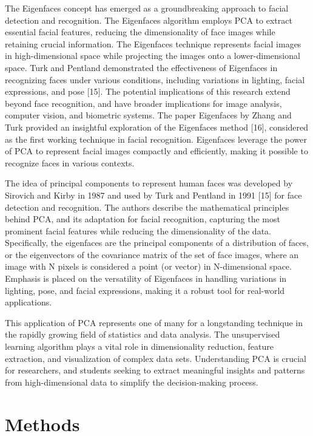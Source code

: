 \documentclass[
  letterpaper,
  DIV=11,
  numbers=noendperiod]{scrreprt}
\begin{document}
The Eigenfaces concept has emerged as a groundbreaking approach to
facial detection and recognition. The Eigenfaces algorithm employs PCA
to extract essential facial features, reducing the dimensionality of
face images while retaining crucial information. The Eigenfaces
technique represents facial images in high-dimensional space while
projecting the images onto a lower-dimensional space. Turk and Pentland
demonstrated the effectiveness of Eigenfaces in recognizing faces under
various conditions, including variations in lighting, facial
expressions, and pose {[}15{]}. The potential implications of this
research extend beyond face recognition, and have broader implications
for image analysis, computer vision, and biometric systems. The paper
Eigenfaces by Zhang and Turk provided an insightful exploration of the
Eigenfaces method {[}16{]}, considered as the first working technique in
facial recognition. Eigenfaces leverage the power of PCA to represent
facial images compactly and efficiently, making it possible to recognize
faces in various contexts.

The idea of principal components to represent human faces was developed
by Sirovich and Kirby in 1987 and used by Turk and Pentland in 1991
{[}15{]} for face detection and recognition. The authors describe the
mathematical principles behind PCA, and its adaptation for facial
recognition, capturing the most prominent facial features while reducing
the dimensionality of the data. Specifically, the eigenfaces are the
principal components of a distribution of faces, or the eigenvectors of
the covariance matrix of the set of face images, where an image with N
pixels is considered a point (or vector) in N-dimensional space.
Emphasis is placed on the versatility of Eigenfaces in handling
variations in lighting, pose, and facial expressions, making it a robust
tool for real-world applications.

This application of PCA represents one of many for a longstanding
technique in the rapidly growing field of statistics and data analysis.
The unsupervised learning algorithm plays a vital role in dimensionality
reduction, feature extraction, and visualization of complex data sets.
Understanding PCA is crucial for researchers, and students seeking to
extract meaningful insights and patterns from high-dimensional data to
simplify the decision-making process.


\hypertarget{methods}{%
\chapter{Methods}\label{methods}}
\end{document}
